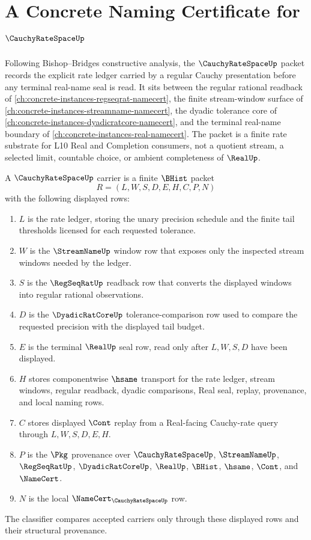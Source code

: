\chapter{A Concrete Naming Certificate for $\CauchyRateSpaceUp$}
\label{ch:concrete-instances-cauchy-rate-space-namecert}

Following Bishop--Bridges constructive analysis, the $\CauchyRateSpaceUp$ packet records the explicit rate ledger carried by a regular Cauchy presentation before any terminal real-name seal is read. It sits between the regular rational readback of \autoref{ch:concrete-instances-regseqrat-namecert}, the finite stream-window surface of \autoref{ch:concrete-instances-streamname-namecert}, the dyadic tolerance core of \autoref{ch:concrete-instances-dyadicratcore-namecert}, and the terminal real-name boundary of \autoref{ch:concrete-instances-real-namecert}. The packet is a finite rate substrate for L10 Real and Completion consumers, not a quotient stream, a selected limit, countable choice, or ambient completeness of $\RealUp$.

\begin{definition}
\label{def:cauchy-rate-space-carrier}
A $\CauchyRateSpaceUp$ carrier is a finite $\BHist$ packet
$$
R=(L,W,S,D,E,H,C,P,N)
$$
with the following displayed rows:
\begin{enumerate}
\item $L$ is the rate ledger, storing the unary precision schedule and the finite tail thresholds licensed for each requested tolerance.
\item $W$ is the $\StreamNameUp$ window row that exposes only the inspected stream windows needed by the ledger.
\item $S$ is the $\RegSeqRatUp$ readback row that converts the displayed windows into regular rational observations.
\item $D$ is the $\DyadicRatCoreUp$ tolerance-comparison row used to compare the requested precision with the displayed tail budget.
\item $E$ is the terminal $\RealUp$ seal row, read only after $L,W,S,D$ have been displayed.
\item $H$ stores componentwise $\hsame$ transport for the rate ledger, stream windows, regular readback, dyadic comparisons, Real seal, replay, provenance, and local naming rows.
\item $C$ stores displayed $\Cont$ replay from a Real-facing Cauchy-rate query through $L,W,S,D,E,H$.
\item $P$ is the $\Pkg$ provenance over $\CauchyRateSpaceUp$, $\StreamNameUp$, $\RegSeqRatUp$, $\DyadicRatCoreUp$, $\RealUp$, $\BHist$, $\hsame$, $\Cont$, and $\NameCert$.
\item $N$ is the local $\NameCert_{\CauchyRateSpaceUp}$ row.
\end{enumerate}
The classifier compares accepted carriers only through these displayed rows and their structural provenance.
\end{definition}

